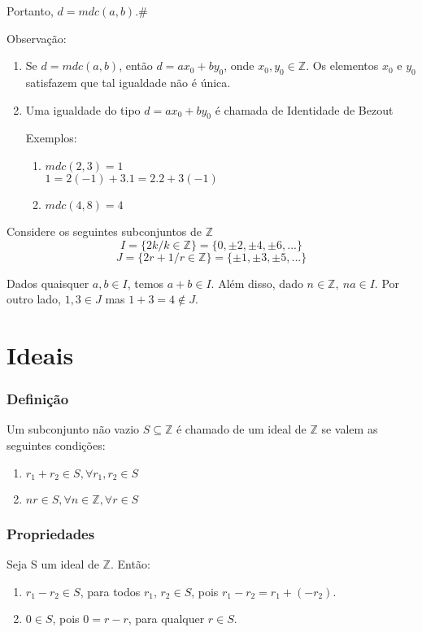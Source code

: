 Portanto, $d=mdc(a,b)$.\#

Observa{\c c}{\~a}o:
\begin{enumerate}
\item Se $d=mdc(a,b)$, ent{\~a}o $d=ax_{0}+by_{0}$, onde $x_{0},y_{0}\in\mathbb{Z}$. Os elementos $x_{0}$ e $y_{0}$ satisfazem que tal igualdade n{\~a}o {\'e} {\'u}nica.
\item Uma igualdade do tipo $d=ax_{0}+by_{0}$ {\'e} chamada de Identidade de Bezout

Exemplos:
\begin{enumerate}
\item $mdc(2,3)=1$\\
$1=2(-1)+3.1=2.2+3(-1)$
\item $mdc(4,8)=4$\\
\end{enumerate}
\end{enumerate}

Considere os seguintes subconjuntos de $\mathbb{Z}$\\
\[I=\{2k/k\in\mathbb{Z}\}=\{0,\pm 2,\pm 4,\pm 6,...\}\]\[J=\{2r+1/r\in\mathbb{Z}\}=\{\pm 1,\pm 3,\pm 5,...\}\]

Dados quaisquer $a,b\in I$, temos $a+b\in I$. Al{\'e}m disso, dado $n\in\mathbb{Z},\ na\in I$. Por outro lado, $1,3\in J$ mas $1+3=4\notin J$.

\section{Ideais}

\subsubsection{Defini{\c c}{\~a}o}
\begin{definicao}[Ideal] Um subconjunto n{\~a}o vazio $S\subseteq\mathbb{Z}$ {\'e} chamado de um ideal de $\mathbb{Z}$ se valem as seguintes condi{\c c}{\~o}es:
\begin{enumerate}
\item $r_{1}+r_{2}\in S,\forall r_{1},r_{2}\in S$
\item $nr\in S,\forall n\in\mathbb{Z},\forall r\in S$
\end{enumerate}
\end{definicao}

\subsubsection{Propriedades}
Seja S um ideal de $\mathbb{Z}$. Então:
\begin{enumerate}
\item $r_1 - r_2\in S$, para todos $r_1$, $r_2 \in S$, pois $r_1 - r_2 = r_1 + (-r_2)$.
\item $0 \in S$, pois $0 = r - r$, para qualquer $r\in S$.
\end{enumerate}

